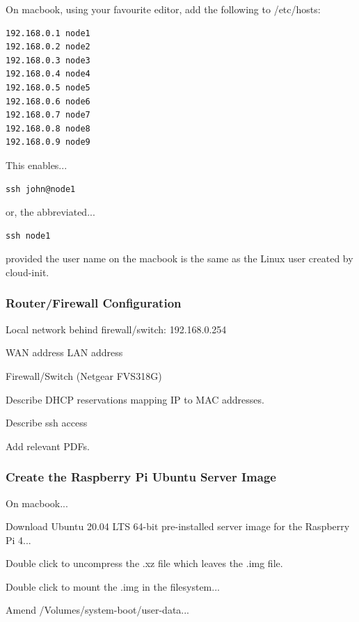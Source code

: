 \documentclass{article}
\begin{document}
On macbook, using your favourite editor, add the following to /etc/hosts:

\begin{lstlisting}[]
192.168.0.1 node1
192.168.0.2 node2
192.168.0.3 node3
192.168.0.4 node4
192.168.0.5 node5
192.168.0.6 node6
192.168.0.7 node7
192.168.0.8 node8
192.168.0.9 node9
\end{lstlisting}

This enables...

\begin{lstlisting}[]
ssh john@node1
\end{lstlisting}

or, the abbreviated...

\begin{lstlisting}[]
ssh node1
\end{lstlisting}

provided the user name on the macbook is the same as the Linux user created by cloud-init.



\subsubsection{Router/Firewall Configuration}

Local network behind firewall/switch: 192.168.0.254

WAN address
LAN address

Firewall/Switch (Netgear FVS318G)

Describe DHCP reservations mapping IP to MAC addresses.

Describe ssh access

Add relevant PDFs.


\subsubsection{Create the Raspberry Pi Ubuntu Server Image}

On macbook...

Download Ubuntu 20.04 LTS 64-bit pre-installed server image for the Raspberry Pi 4...

Double click to uncompress the .xz file which leaves the .img file. 

Double click to mount the .img in the filesystem...

Amend /Volumes/system-boot/user-data...


\end{document}
